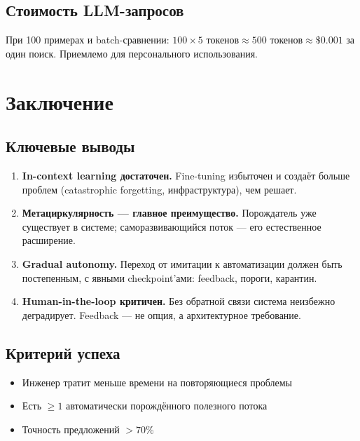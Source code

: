 \documentclass[12pt, a4paper, twoside]{article}
\begin{document}
\subsection{Стоимость LLM-запросов}

При 100 примерах и batch-сравнении:
$100 \times 5 \text{ токенов} \approx 500 \text{ токенов} \approx \$0.001$ за один поиск.
Приемлемо для персонального использования.

\section{Заключение}

\subsection{Ключевые выводы}

\begin{enumerate}[leftmargin=1.5em]
  \item \textbf{In-context learning достаточен.} Fine-tuning избыточен и
    создаёт больше проблем (catastrophic forgetting, инфраструктура), чем решает.

  \item \textbf{Метациркулярность --- главное преимущество.} Порождатель уже
    существует в системе; саморазвивающийся поток --- его естественное расширение.

  \item \textbf{Gradual autonomy.} Переход от имитации к автоматизации
    должен быть постепенным, с явными checkpoint'ами: feedback, пороги, карантин.

  \item \textbf{Human-in-the-loop критичен.} Без обратной связи система
    неизбежно деградирует. Feedback --- не опция, а архитектурное требование.
\end{enumerate}

\subsection{Критерий успеха}

\begin{successbox}[title={Через месяц система считается успешной, если:}]
\begin{itemize}[leftmargin=1em]
  \item Инженер тратит меньше времени на повторяющиеся проблемы
  \item Есть $\geq 1$ автоматически порождённого полезного потока
  \item Точность предложений $> 70\%$
\end{itemize}
\end{successbox}
\end{document}
